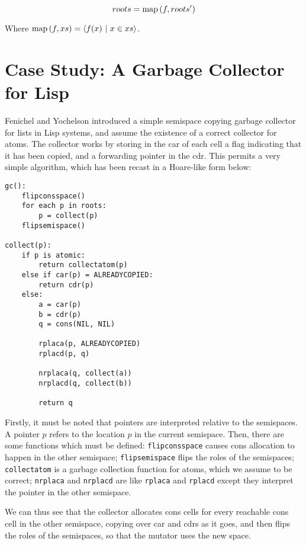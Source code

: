 \begin{definition}
  \label{def:c-root-translation}
  \[roots = \mathrm{map}\left(f, roots'\right)\]

  Where $\mathrm{map}\left(f, xs\right) = \langle f(x)~|~x \in xs \rangle$.
\end{definition}

\section{Case Study: A Garbage Collector for Lisp}
\label{sec:copying-example}

Fenichel and Yochelson\cite{Fenichel69} introduced a simple semispace
copying garbage collector for lists in Lisp systems, and assume the
existence of a correct collector for atoms. The collector works by
storing in the car of each cell a flag indicating that it has been
copied, and a forwarding pointer in the cdr. This permits a very
simple algorithm, which has been recast in a Hoare-like form below:

\begin{lstlisting}
gc():
    flipconsspace()
    for each p in roots:
        p = collect(p)
    flipsemispace()

collect(p):
    if p is atomic:
        return collectatom(p)
    else if car(p) = ALREADYCOPIED:
        return cdr(p)
    else:
        a = car(p)
        b = cdr(p)
        q = cons(NIL, NIL)

        rplaca(p, ALREADYCOPIED)
        rplacd(p, q)

        nrplaca(q, collect(a))
        nrplacd(q, collect(b))

        return q
\end{lstlisting}

Firstly, it must be noted that pointers are interpreted relative to
the semispaces. A pointer $p$ refers to the location $p$ in the
current semispace. Then, there are some functions which must be
defined: \texttt{flipconsspace} causes cons allocation to happen in
the other semispace; \texttt{flipsemispace} flips the roles of the
semispaces; \texttt{collectatom} is a garbage collection function for
atoms, which we assume to be correct; \texttt{nrplaca} and
\texttt{nrplacd} are like \texttt{rplaca} and \texttt{rplacd} except
they interpret the pointer in the other semispace.

We can thus see that the collector allocates cons cells for every
reachable cons cell in the other semispace, copying over car and cdrs
as it goes, and then flips the roles of the semispaces, so that the
mutator uses the new space.

